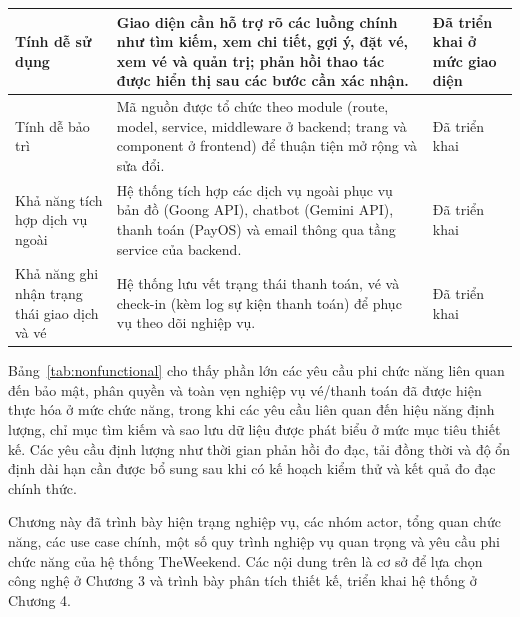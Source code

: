 ﻿\documentclass[../DoAn.tex]{subfiles}
\begin{document}
\begin{longtable}{|L{3.0cm}|L{8.4cm}|L{2.8cm}|}
\hline
Tính dễ sử dụng & Giao diện cần hỗ trợ rõ các luồng chính như tìm kiếm, xem chi tiết, gợi ý, đặt vé, xem vé và quản trị; phản hồi thao tác được hiển thị sau các bước cần xác nhận. & Đã triển khai ở mức giao diện \\
\hline
Tính dễ bảo trì & Mã nguồn được tổ chức theo module (route, model, service, middleware ở backend; trang và component ở frontend) để thuận tiện mở rộng và sửa đổi. & Đã triển khai \\
\hline
Khả năng tích hợp dịch vụ ngoài & Hệ thống tích hợp các dịch vụ ngoài phục vụ bản đồ (Goong API), chatbot (Gemini API), thanh toán (PayOS) và email thông qua tầng service của backend. & Đã triển khai \\
\hline
Khả năng ghi nhận trạng thái giao dịch và vé & Hệ thống lưu vết trạng thái thanh toán, vé và check-in (kèm log sự kiện thanh toán) để phục vụ theo dõi nghiệp vụ. & Đã triển khai \\
\hline
\end{longtable}
\endgroup

Bảng~\ref{tab:nonfunctional} cho thấy phần lớn các yêu cầu phi chức năng liên quan đến bảo mật, phân quyền và toàn vẹn nghiệp vụ vé/thanh toán đã được hiện thực hóa ở mức chức năng, trong khi các yêu cầu liên quan đến hiệu năng định lượng, chỉ mục tìm kiếm và sao lưu dữ liệu được phát biểu ở mức mục tiêu thiết kế. Các yêu cầu định lượng như thời gian phản hồi đo đạc, tải đồng thời và độ ổn định dài hạn cần được bổ sung sau khi có kế hoạch kiểm thử và kết quả đo đạc chính thức.

Chương này đã trình bày hiện trạng nghiệp vụ, các nhóm actor, tổng quan chức năng, các use case chính, một số quy trình nghiệp vụ quan trọng và yêu cầu phi chức năng của hệ thống TheWeekend. Các nội dung trên là cơ sở để lựa chọn công nghệ ở Chương 3 và trình bày phân tích thiết kế, triển khai hệ thống ở Chương 4.
\end{document}

